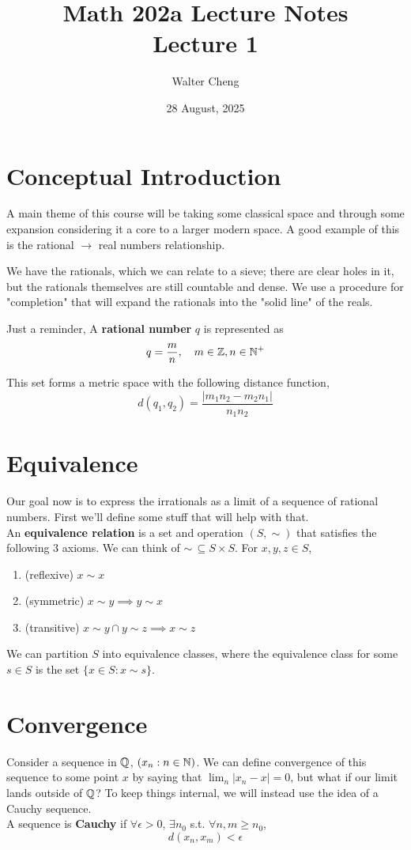 \documentclass[11pt]{article}
\title{Math 202a Lecture Notes\\ Lecture 1}
\date{28 August, 2025}
\author{Walter Cheng}
\begin{document}
\maketitle

\section{Conceptual Introduction}
A main theme of this course will be taking some classical space and through some expansion considering it a core to a larger modern space. A good example of this is the rational $\to$ real numbers relationship.

We have the rationals, which we can relate to a sieve; there are clear holes in it, but the rationals themselves are still countable and dense. We use a procedure for "completion" that will expand the rationals into the "solid line" of the reals.

Just a reminder,
 A \textbf{rational number} $q$ is represented as
\[q = \frac{m}{n}, \quad m \in \mathbb{Z}, n \in \mathbb{N}^+\]

This set forms a metric space with the following distance function,
\[d(q_1, q_2) = \frac{|m_1n_2 - m_2n_1|}{n_1n_2}\]

\section{Equivalence}

Our goal now is to express the irrationals as a limit of a sequence of rational numbers. First we'll define some stuff that will help with that.\\
 An \textbf{equivalence relation} is a set and operation $(S, \sim)$ that satisfies the following 3 axioms. We can think of $\sim \, \subseteq S \times S$. For $x, y, z \in S$,
\begin{enumerate}
	\item (reflexive) $x \sim x$
	\item (symmetric) $x \sim y \implies y \sim x$
	\item (transitive) $x \sim y \cap y \sim z \implies x \sim z$
\end{enumerate}

We can partition $S$ into equivalence classes, where the equivalence class for some $s \in S$ is the set $\{x \in S : x \sim s\}$.

\section{Convergence}
Consider a sequence in $\mathbb{Q}$, $(x_n : n \in \mathbb{N})$. We can define convergence of this sequence to some point $x$ by saying that $\lim_n |x_n - x| = 0$, but what if our limit lands outside of $\mathbb{Q}$? To keep things internal, we will instead use the idea of a Cauchy sequence.\\
 A sequence is \textbf{Cauchy} if $\forall \epsilon > 0$, $\exists n_0$ s.t. $\forall n, m \geq n_0$,
\[d(x_n, x_m) < \epsilon\]
\end{document}
